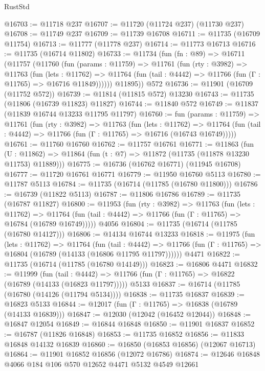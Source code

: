 \begin{lexlean}{RustStd}
\begin{coremodule}
@16703 := @11718 @237
@16707 := @11720 (@11724 @237) (@11730 @237)
@16708 := @11749 @237
@16709 := @11739 @16708
@16711 := @11735 (@16709 @11754)
@16713 := @11777 (@11778 @237)
@16714 := @11773 @16713
@16716 := @11735 (@16714 @11802)
@16733 := @11734
    (fun (fn : @89) =>
    @16711
      (@11757
        (@11760
          (fun (params : @11759) =>
          @11761
            (fun (rty : @3982) =>
            @11763
              (fun (lets : @11762) =>
              @11764 (fun (tail : @4442) => @11766 (fun (Γ : @11765) => @16716 @11849))))))
        @11895))
    @572
@16736 := @11901 (@16709 (@11752 @572))
@16739 := @11814 (@11815 @572) @13230
@16743 := @11735 (@11806 (@16739 @11823) @11827)
@16744 := @11840 @572
@16749 := @11837 (@11839 @16744 @13233 @11795 @11797)
@16760 := fun (params : @11759) =>
  @11761
    (fun (rty : @3982) =>
    @11763
      (fun (lets : @11762) =>
      @11764 (fun (tail : @4442) => @11766 (fun (Γ : @11765) => @16716 (@16743 @16749)))))
@16761 := @11760 @16760
@16762 := @11757 @16761
@16771 := @11863
    (fun (U : @11862) => @11864 (fun (t : @7) => @11872 (@11735 (@11878 @13230 @11753) @11889)))
@16775 := @16736 (@16762 @16771) (@11945 @16708)
@16777 := @11720 @16761 @16771
@16779 := @11950 @16760 @5113
@16780 := @11787 @5113
@16784 := @11735 (@16714 (@11785 (@16780 @11800)))
@16786 := @16739 (@11822 @5113)
@16787 := @11806 @16786
@16789 := @11735 (@16787 @11827)
@16800 := @11953
    (fun (rty : @3982) =>
    @11763
      (fun (lets : @11762) =>
      @11764 (fun (tail : @4442) => @11766 (fun (Γ : @11765) => @16784 (@16789 @16749)))))
    @4056
@16804 := @11735 (@16714 (@11785 (@16780 @14127)))
@16806 := @14134 @16744 @13233
@16818 := @11975
    (fun (lets : @11762) =>
    @11764
      (fun (tail : @4442) =>
      @11766 (fun (Γ : @11765) => @16804 (@16789 (@14133 (@16806 @11795 @11797))))))
    @4471
@16822 := @11735 (@16714 (@11785 (@16780 @14149)))
@16823 := @16806 @4471
@16832 := @11999
    (fun (tail : @4442) => @11766 (fun (Γ : @11765) => @16822 (@16789 (@14133 (@16823 @11797)))))
    @5133
@16837 := @16714 (@11785 (@16780 (@14126 (@11794 @5134))))
@16838 := @11735 @16837
@16839 := @16823 @5133
@16844 := @12017 (fun (Γ : @11765) => @16838 (@16789 (@14133 @16839)))
@16847 := @12030 (@12042 (@16452 @12044))
@16848 := @16847 @12054
@16849 := @16844 @16848
@16850 := @11901 @16837
@16852 := @16787 (@11826 @16848)
@16853 := @11735 @16852
@16856 := @11833 @16848 @14132 @16839
@16860 := @16850 (@16853 @16856) (@12067 @16713)
@16864 := @11901 @16852 @16856 (@12072 @16786)
@16874 := @12646 @16848 @4066 @184 @106 @570 @12652 @4471 @5132 @4549 @12661

\end{coremodule}
\end{lexlean}
